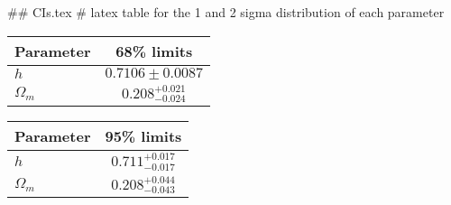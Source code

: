 ## CIs.tex
# latex table for the 1 and 2 sigma distribution of each parameter

\begin{tabular} { l  c}
 Parameter &  68\% limits\\
\hline
{\boldmath$h              $} & $0.7106\pm 0.0087          $\\
{\boldmath$\Omega_m       $} & $0.208^{+0.021}_{-0.024}   $\\
\hline
\end{tabular}

\begin{tabular} { l  c}
 Parameter &  95\% limits\\
\hline
{\boldmath$h              $} & $0.711^{+0.017}_{-0.017}   $\\
{\boldmath$\Omega_m       $} & $0.208^{+0.044}_{-0.043}   $\\
\hline
\end{tabular}
